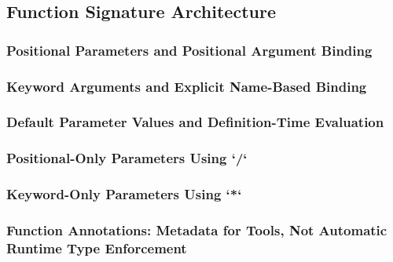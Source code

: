 \subsection{Function Signature Architecture}
\subsubsection{Positional Parameters and Positional Argument Binding}
\subsubsection{Keyword Arguments and Explicit Name-Based Binding}
\subsubsection{Default Parameter Values and Definition-Time Evaluation}
\subsubsection{Positional-Only Parameters Using `/`}
\subsubsection{Keyword-Only Parameters Using `*`}
\subsubsection{Function Annotations: Metadata for Tools, Not Automatic Runtime Type Enforcement}
